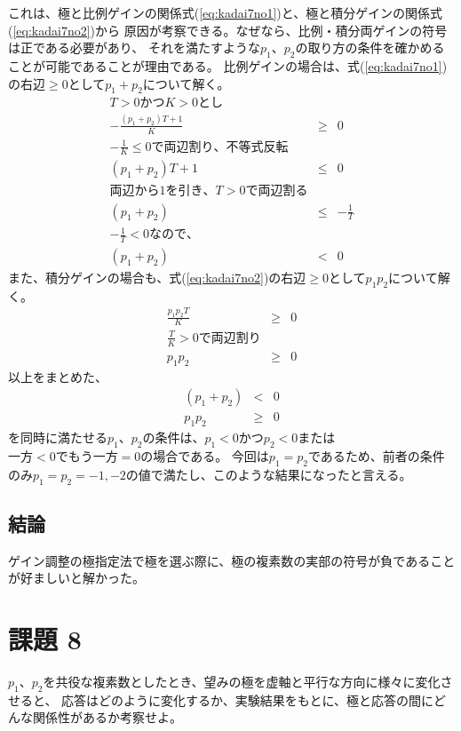 \documentclass[10pt]{jarticle}
\begin{document}
これは、極と比例ゲインの関係式(\ref{eq:kadai7no1})と、極と積分ゲインの関係式(\ref{eq:kadai7no2})から
原因が考察できる。なぜなら、比例・積分両ゲインの符号は正である必要があり、
それを満たすような$p_{1}、p_{2}$の取り方の条件を確かめることが可能であることが理由である。
比例ゲインの場合は、式(\ref{eq:kadai7no1})の右辺$\geq 0$として$p_{1} + p_{2}$について解く。
\begin{eqnarray*}
	T > 0 かつ K > 0 とし \\
	-\frac{(p_{1} + p_{2})T + 1}{K} &\geq& 0 \\
	-\frac{1}{K} \leq 0 で両辺割り、不等式反転 \\
	(p_{1} + p_{2})T + 1 &\leq& 0 \\
	両辺から 1 を引き、T > 0 で両辺割る \\
	(p_{1} + p_{2}) &\leq& -\frac{1}{T} \\
	-\frac{1}{T} < 0 なので、 \\
	(p_{1} + p_{2}) &<& 0 
\end{eqnarray*}
また、積分ゲインの場合も、式(\ref{eq:kadai7no2})の右辺$\geq 0$として$p_{1}p_{2}$について解く。
\begin{eqnarray*}
	\frac{p_{1}p_{2}T}{K} &\geq& 0 \\
	\frac{T}{K} > 0 で両辺割り \\
	p_{1}p_{2} &\geq& 0
\end{eqnarray*}
以上をまとめた、
\begin{eqnarray*}
	(p_{1} + p_{2}) &<& 0 \label{eq:kadai7no3}\\
	p_{1}p_{2} &\geq& 0 \label{eq:kadai7no4}
\end{eqnarray*}
を同時に満たせる$p_{1}、p_{2}$の条件は、$p_{1} < 0 かつ p_{2} < 0$または$一方 < 0 でもう一方 = 0 $の場合である。
今回は$p_{1}=p_{2}$であるため、前者の条件のみ$p_{1}=p_{2}= -1, -2$の値で満たし、このような結果になったと言える。



%

\subsection{結論}
%
ゲイン調整の極指定法で極を選ぶ際に、極の複素数の実部の符号が負であることが好ましいと解かった。
%


\section{課題 8}
%
$p_{1}$、$p_{2}$を共役な複素数としたとき、望みの極を虚軸と平行な方向に様々に変化させると、
応答はどのように変化するか、実験結果をもとに、極と応答の間にどんな関係性があるか考察せよ。
%
\end{document}
